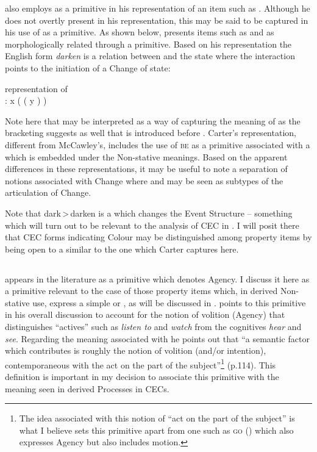 \citet{Carter1976} also employs \CAUSE as a primitive in his
representation of an item such as \DARKEN.  Although he does not
overtly present \BECOME in his representation, this may be said to be
captured in his use of \CHANGE as a primitive.  As shown below,
\citet{Carter1976} presents items such as \DARK and \DARKEN as
morphologically related through a  primitive.  Based on his
representation the English form \textit{darken} is a relation between \CAUSE
and the state \BEDARK where the interaction points to the initiation
of a Change of state:

\ea%
\label{ex:4:14}
 representation of \DARKEN\\
\DARKEN: x \CAUSE ( ( y \BEDARK) \CHANGE) 
\z

Note here that \CHANGE may be interpreted as a way of capturing the
meaning of \BECOME as the bracketing suggests as well that \CHANGE is
introduced before \CAUSE.  Carter’s representation, different from
McCawley’s, includes the use of \textsc{be} as a primitive associated with a
 which is embedded under the Non-stative meanings.  Based on the
apparent differences in these representations, it may be useful to
note a separation of notions associated with Change where \CAUSE and
\BECOME may be seen as subtypes of the articulation of Change.

Note that dark\,>\,darken is a  which changes the
Event Structure -- something which will turn out to be relevant to the
analysis of CEC  in . I will posit
there that CEC forms indicating Colour may be distinguished among
property items by being open to a  similar to the
one which Carter captures here.

\subsection{\DO}\label{sec:4.3.2}

\DO appears in the literature as a primitive which denotes Agency.  I
discuss it here as a primitive relevant to the case of those property
items which, in derived Non-stative use, express a simple  or
, as will be discussed in . \citet{Dowty1979}
points to this primitive in his overall discussion to account for the
notion of volition (Agency) that distinguishes ``actives” such as
\textit{listen to} and \textit{watch} from the cognitives
\textit{hear} and \textit{see}. Regarding the meaning associated with
\DO he points out that ``a semantic factor which \DO contributes is
roughly the notion of volition (and\slash or intention), contemporaneous
with the act on the part of the subject”\footnote{The idea associated
  with this notion of ``act on the part of the subject'' is what I
  believe sets this primitive apart from one such as \textsc{go}
  (\citealt{Jackendoff1972, Jackendoff1996}) which also expresses Agency but
  also includes motion.} (p.114).  This definition is important in
my decision to associate this primitive with the meaning seen in
derived Processes in CECs.

